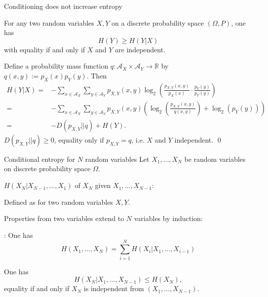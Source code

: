 \begin{frame}{Conditioning does not increase entropy}
\begin{proposition}
For any two random variables $X,Y$ on a discrete probability space $(\Omega,P)$, one has
\[
H(Y)\geq H(Y|X)
\]
with equality if and only if $X$ and $Y$ are independent. 
\end{proposition}
%
 Define a probability mass function $q:\mathcal{A}_X\times\mathcal{A}_Y\to\mathbb{R}$ by $q(x,y):=p_X(x)p_Y(y)$. 
Then 
\begin{align*}
H(Y|X)=&-\sum_{x\in\mathcal{A}_X}\sum_{y\in\mathcal{A}_Y}p_{X,Y}(x,y)\log_2\left(\frac{p_{X,Y}(x,y)}{p_X(x)}\cdot \frac{p_Y(y)}{p_Y(y)}\right)\\
=&-\sum_{x\in\mathcal{A}_X}\sum_{y\in\mathcal{A}_Y}p_{X,Y}(x,y)\left(\log_2\left(\frac{p_{X,Y}(x,y)}{q(x,y)}\right)+\log_2(p_Y(y))\right)\\
=&-D(p_{X,Y}||q)+H(Y). 
\end{align*}
$D(p_{X,Y}||q)\geq 0$, equality only if $p_{X,Y}=q$, i.e. $X$ and $Y$ independent. \qed
\end{frame}


\begin{frame}{Conditional entropy for $N$ random variables}
Let $X_1,\dots,X_N$ be random variables on discrete probability space $\Omega$.
\bit
\item {} $H(X_N|X_{N-1},\dots,X_1)$ of $X_N$ given  $X_1,\dots,X_{N-1}$:  

Defined as for two random variables $X, Y$. 
\item Properties from two variables extend to $N$ variables by induction: 
\eit
\begin{proposition}
\bit
\item {}: One has
\[
H(X_1,\dots,X_N)=\sum_{i=1}^NH(X_i|X_1,\dots,X_{i-1})
\]
\item {} One has
\[
H(X_N|X_1,\dots,X_{N-1})\leq H(X_N),
\]
equality if and only if $X_N$ is independent from $(X_1,\dots,X_{N-1})$. 
\eit
\end{proposition}
\end{frame}




